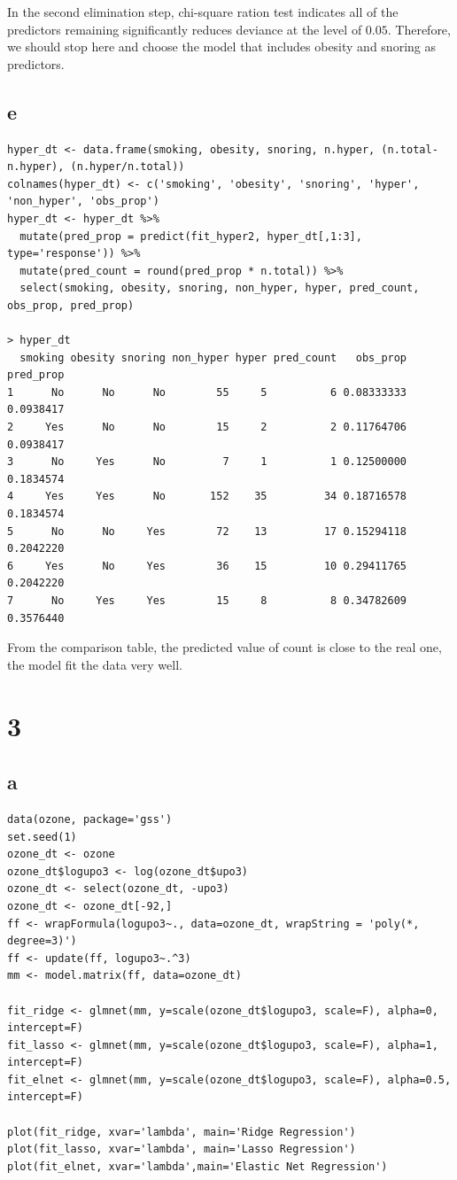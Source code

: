 \documentclass[11pt,letterpaper]{article}
\begin{document}
\noindent In the second elimination step, chi-square ration test indicates all of the predictors remaining significantly reduces deviance at the level of $0.05$. Therefore, we should stop here and choose the model that includes obesity and snoring as predictors. 

\subsection*{e}
\begin{verbatim}
hyper_dt <- data.frame(smoking, obesity, snoring, n.hyper, (n.total-n.hyper), (n.hyper/n.total))
colnames(hyper_dt) <- c('smoking', 'obesity', 'snoring', 'hyper', 'non_hyper', 'obs_prop')
hyper_dt <- hyper_dt %>%
  mutate(pred_prop = predict(fit_hyper2, hyper_dt[,1:3], type='response')) %>%
  mutate(pred_count = round(pred_prop * n.total)) %>%
  select(smoking, obesity, snoring, non_hyper, hyper, pred_count, obs_prop, pred_prop)
  
> hyper_dt
  smoking obesity snoring non_hyper hyper pred_count   obs_prop pred_prop
1      No      No      No        55     5          6 0.08333333 0.0938417
2     Yes      No      No        15     2          2 0.11764706 0.0938417
3      No     Yes      No         7     1          1 0.12500000 0.1834574
4     Yes     Yes      No       152    35         34 0.18716578 0.1834574
5      No      No     Yes        72    13         17 0.15294118 0.2042220
6     Yes      No     Yes        36    15         10 0.29411765 0.2042220
7      No     Yes     Yes        15     8          8 0.34782609 0.3576440
\end{verbatim}
\noindent From the comparison table, the predicted value of count is close to the real one, the model fit the data very well. 

\section*{3}
\subsection*{a}
\begin{verbatim}
data(ozone, package='gss')
set.seed(1)
ozone_dt <- ozone
ozone_dt$logupo3 <- log(ozone_dt$upo3)
ozone_dt <- select(ozone_dt, -upo3)
ozone_dt <- ozone_dt[-92,]
ff <- wrapFormula(logupo3~., data=ozone_dt, wrapString = 'poly(*, degree=3)')
ff <- update(ff, logupo3~.^3)
mm <- model.matrix(ff, data=ozone_dt)

fit_ridge <- glmnet(mm, y=scale(ozone_dt$logupo3, scale=F), alpha=0, intercept=F)
fit_lasso <- glmnet(mm, y=scale(ozone_dt$logupo3, scale=F), alpha=1, intercept=F)
fit_elnet <- glmnet(mm, y=scale(ozone_dt$logupo3, scale=F), alpha=0.5, intercept=F)

plot(fit_ridge, xvar='lambda', main='Ridge Regression')
plot(fit_lasso, xvar='lambda', main='Lasso Regression')
plot(fit_elnet, xvar='lambda',main='Elastic Net Regression')
\end{verbatim}
\end{document}
